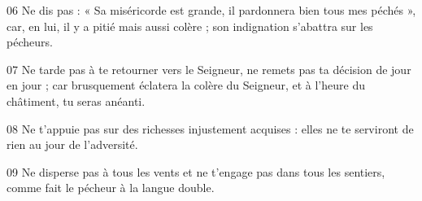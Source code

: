 
06 Ne dis pas : « Sa miséricorde est grande, il pardonnera bien tous mes péchés », car, en lui, il y a pitié mais aussi colère ; son indignation s’abattra sur les pécheurs.

07 Ne tarde pas à te retourner vers le Seigneur, ne remets pas ta décision de jour en jour ; car brusquement éclatera la colère du Seigneur, et à l’heure du châtiment, tu seras anéanti.

08 Ne t’appuie pas sur des richesses injustement acquises : elles ne te serviront de rien au jour de l’adversité.

09 Ne disperse pas à tous les vents et ne t’engage pas dans tous les sentiers, comme fait le pécheur à la langue double.
